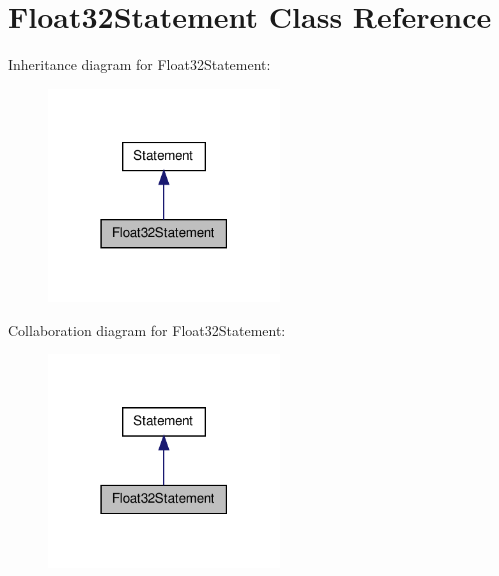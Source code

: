 \hypertarget{class_float32_statement}{\section{Float32\-Statement Class Reference}
\label{class_float32_statement}
}


Inheritance diagram for Float32\-Statement\-:
\nopagebreak
\begin{figure}[H]
\begin{center}
\leavevmode
\includegraphics[width=174pt]{class_float32_statement__inherit__graph}
\end{center}
\end{figure}


Collaboration diagram for Float32\-Statement\-:
\nopagebreak
\begin{figure}[H]
\begin{center}
\leavevmode
\includegraphics[width=174pt]{class_float32_statement__coll__graph}
\end{center}
\end{figure}
